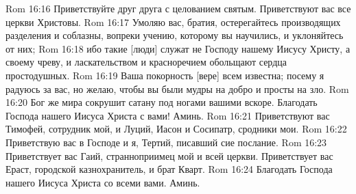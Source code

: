 Rom 16:16  Приветствуйте друг друга с целованием святым. Приветствуют вас все церкви Христовы.
Rom 16:17  Умоляю вас, братия, остерегайтесь производящих разделения и соблазны, вопреки учению, которому вы научились, и уклоняйтесь от них;
Rom 16:18  ибо такие [люди] служат не Господу нашему Иисусу Христу, а своему чреву, и ласкательством и красноречием обольщают сердца простодушных.
Rom 16:19  Ваша покорность [вере] всем известна; посему я радуюсь за вас, но желаю, чтобы вы были мудры на добро и просты на зло.
Rom 16:20  Бог же мира сокрушит сатану под ногами вашими вскоре. Благодать Господа нашего Иисуса Христа с вами! Аминь.
Rom 16:21  Приветствуют вас Тимофей, сотрудник мой, и Луций, Иасон и Сосипатр, сродники мои.
Rom 16:22  Приветствую вас в Господе и я, Тертий, писавший сие послание.
Rom 16:23  Приветствует вас Гаий, странноприимец мой и всей церкви. Приветствует вас Ераст, городской казнохранитель, и брат Кварт.
Rom 16:24  Благодать Господа нашего Иисуса Христа со всеми вами. Аминь.


